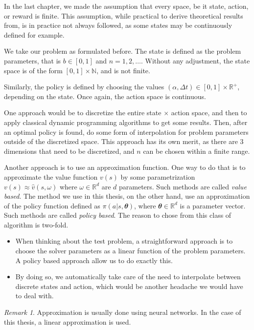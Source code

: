 \documentclass[
  letterpaper,
]{report}
\theoremstyle{plain}
\theoremstyle{definition}
\theoremstyle{definition}
\theoremstyle{remark}
\newtheorem*{remark}{Remark}
\begin{document}
In the last chapter, we made the assumption that every space, be it
state, action, or reward is finite. This assumption, while practical to
derive theoretical results from, is in practice not always followed, as
some states may be continuously defined for example.

We take our problem as formulated before. The state is defined as the
problem parameters, that is \(b\in[0,1]\) and \(n = 1 , 2, \dots\).
Without any adjustment, the state space is of the form
\([0,1] \times \mathbb{N}\), and is not finite.

Similarly, the policy is defined by choosing the values
\((\alpha,\Delta t) \in [0,1]\times \mathbb{R}^+\), depending on the
state. Once again, the action space is continuous.

One approach would be to discretize the entire state \(\times\) action
space, and then to apply classical dynamic programming algorithms to get
some results. Then, after an optimal policy is found, do some form of
interpolation for problem parameters outside of the discretized space.
This approach has its own merit, as there are 3 dimensions that need to
be discretized, and \(n\) can be chosen within a finite range.

Another approach is to use an approximation function. One way to do that
is to approximate the value function \(v(s)\) by some parametrization
\(v(s) \approx \hat{v}(s,\omega)\) where \(\omega \in \mathbb{R}^d\) are
\(d\) parameters. Such methods are called \emph{value based}. The method
we use in this thesis, on the other hand, use an approximation of the
policy function defined as \(\pi(a|s,\mathbfit{\theta})\), where
\(\mathbfit{\theta}\in \mathbb{R}^d\) is a parameter vector. Such
methods are called \emph{policy based}. The reason to chose from this
class of algorithm is two-fold.

\begin{itemize}
\item
  When thinking about the test problem, a straightforward approach is to
  choose the solver parameters as a linear function of the problem
  parameters. A policy based approach allow us to do exactly this.
\item
  By doing so, we automatically take care of the need to interpolate
  between discrete states and action, which would be another headache we
  would have to deal with.
\end{itemize}

\begin{remark}

Approximation is usually done using neural networks. In the case of this
thesis, a linear approximation is used.

\end{remark}
\end{document}

